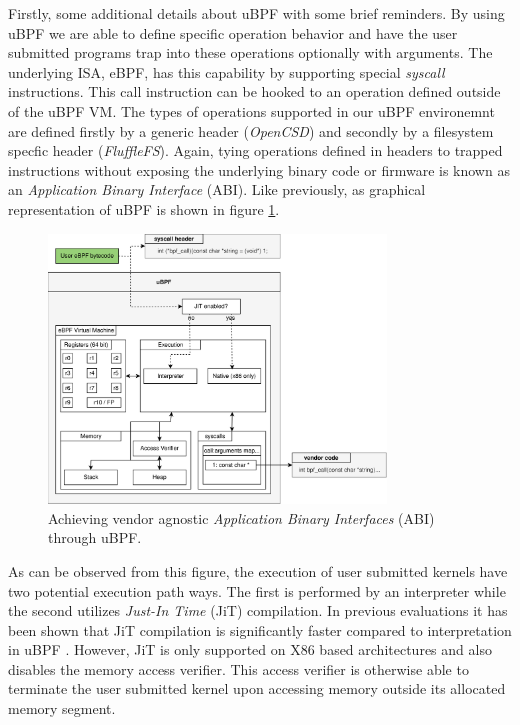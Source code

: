 Firstly, some additional details about uBPF with some brief reminders. By using
uBPF we are able to define specific operation behavior and have the user
submitted programs trap into these operations optionally with arguments. The
underlying ISA, eBPF, has this capability by supporting special
\textit{syscall} instructions. This call instruction can be hooked to an
operation defined outside of the uBPF VM. The types of operations supported in
our uBPF environemnt are defined firstly by a generic header (\textit{OpenCSD})
and secondly by a filesystem specfic header (\textit{FluffleFS}). Again, tying
operations defined in headers to trapped instructions without exposing the
underlying binary code or firmware is known as an
\textit{Application Binary Interface} (ABI). Like previously, as graphical
representation of uBPF is shown in figure \ref{figure:ubpf-abi2}.

\begin{figure}
    \centering
	\includegraphics[width=0.8\textwidth]{resources/images/ubpf-abi.pdf}
	\caption{Achieving vendor agnostic \textit{Application Binary Interfaces}
        (ABI) through uBPF.}
    \label{figure:ubpf-abi2}
\end{figure}

As can be observed from this figure, the execution of user submitted kernels
have two potential execution path ways. The first is performed by an interpreter
while the second utilizes \textit{Just-In Time} (JiT) compilation. In previous
evaluations it has been shown that JiT compilation is significantly faster
compared to interpretation in uBPF \cite{lukken2021zcsd}. However, JiT is only
supported on X86 based architectures and also disables the memory access
verifier. This access verifier is otherwise able to terminate the user submitted
kernel upon accessing memory outside its allocated memory segment.

